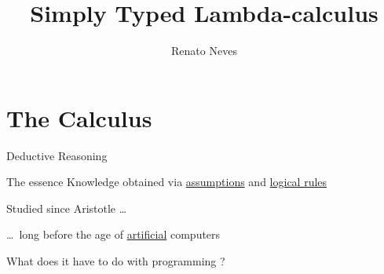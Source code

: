 \documentclass{beamer}
\author[Renato Neves]{Renato Neves}
\date{}
\begin{document}
\title{Simply Typed Lambda-calculus}

\frame[plain]{\titlepage}

\section{The Calculus} 

\begin{frame}{Deductive Reasoning}

  \begin{block}{The essence}
          Knowledge obtained via \alert{\underline{assumptions}} and
          \alert{\underline{logical rules}}
  \end{block}

  \pause
  \bigskip
  Studied since Aristotle  \dots

  \dots \, long before the age of \alert{\underline{artificial}} computers

  What does it have to do with programming ?
\end{frame}
\end{document}
